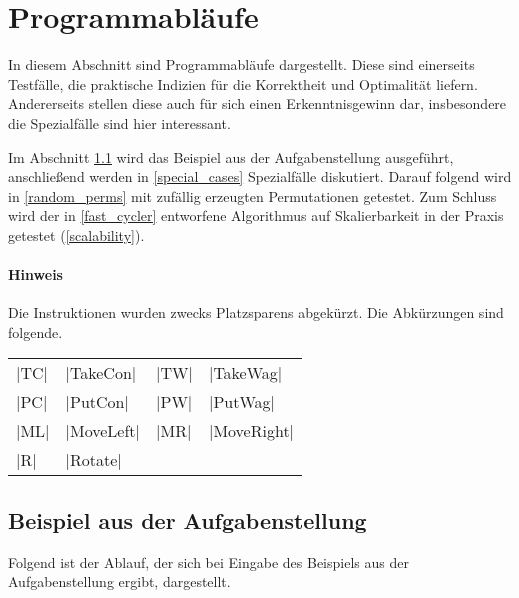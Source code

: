 \clearpage
\section{Programmabläufe}
 In diesem Abschnitt sind Programmabläufe dargestellt. Diese sind einerseits Testfälle, die praktische Indizien für die Korrektheit und Optimalität liefern.
 Andererseits stellen diese auch für sich einen Erkenntnisgewinn dar, insbesondere die Spezialfälle sind hier interessant.

 Im Abschnitt \ref{aufgabenstellung} wird das Beispiel aus der Aufgabenstellung ausgeführt, anschließend werden in \ref{special_cases} Spezialfälle diskutiert.
 Darauf folgend wird in \ref{random_perms} mit zufällig erzeugten Permutationen getestet.
 Zum Schluss wird der in \ref{fast_cycler} entworfene Algorithmus auf Skalierbarkeit in der Praxis getestet (\ref{scalability}).

\paragraph{Hinweis} Die Instruktionen wurden zwecks Platzsparens abgekürzt. Die Abkürzungen sind folgende.
 \begin{center}
  \begin{tabular}{llll}
   |TC| & |TakeCon| & |TW| & |TakeWag| \\
   |PC| & |PutCon|  & |PW| & |PutWag|   \\
   |ML| & |MoveLeft|& |MR| & |MoveRight| \\
    |R| & |Rotate|  &      &      \\
  \end{tabular}
 \end{center}
\clearpage
\subsection{Beispiel aus der Aufgabenstellung}
\label{aufgabenstellung}
Folgend ist der Ablauf, der sich bei Eingabe des Beispiels aus der Aufgabenstellung ergibt, dargestellt.

